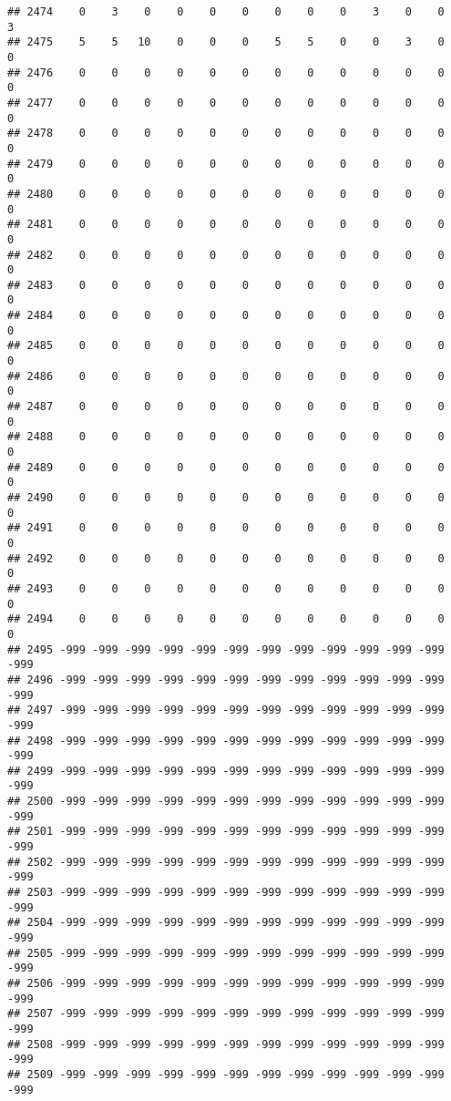 \documentclass[]{article}
\begin{document}
\begin{verbatim}
## 2474    0    3    0    0    0    0    0    0    0    3    0    0    3
## 2475    5    5   10    0    0    0    5    5    0    0    3    0    0
## 2476    0    0    0    0    0    0    0    0    0    0    0    0    0
## 2477    0    0    0    0    0    0    0    0    0    0    0    0    0
## 2478    0    0    0    0    0    0    0    0    0    0    0    0    0
## 2479    0    0    0    0    0    0    0    0    0    0    0    0    0
## 2480    0    0    0    0    0    0    0    0    0    0    0    0    0
## 2481    0    0    0    0    0    0    0    0    0    0    0    0    0
## 2482    0    0    0    0    0    0    0    0    0    0    0    0    0
## 2483    0    0    0    0    0    0    0    0    0    0    0    0    0
## 2484    0    0    0    0    0    0    0    0    0    0    0    0    0
## 2485    0    0    0    0    0    0    0    0    0    0    0    0    0
## 2486    0    0    0    0    0    0    0    0    0    0    0    0    0
## 2487    0    0    0    0    0    0    0    0    0    0    0    0    0
## 2488    0    0    0    0    0    0    0    0    0    0    0    0    0
## 2489    0    0    0    0    0    0    0    0    0    0    0    0    0
## 2490    0    0    0    0    0    0    0    0    0    0    0    0    0
## 2491    0    0    0    0    0    0    0    0    0    0    0    0    0
## 2492    0    0    0    0    0    0    0    0    0    0    0    0    0
## 2493    0    0    0    0    0    0    0    0    0    0    0    0    0
## 2494    0    0    0    0    0    0    0    0    0    0    0    0    0
## 2495 -999 -999 -999 -999 -999 -999 -999 -999 -999 -999 -999 -999 -999
## 2496 -999 -999 -999 -999 -999 -999 -999 -999 -999 -999 -999 -999 -999
## 2497 -999 -999 -999 -999 -999 -999 -999 -999 -999 -999 -999 -999 -999
## 2498 -999 -999 -999 -999 -999 -999 -999 -999 -999 -999 -999 -999 -999
## 2499 -999 -999 -999 -999 -999 -999 -999 -999 -999 -999 -999 -999 -999
## 2500 -999 -999 -999 -999 -999 -999 -999 -999 -999 -999 -999 -999 -999
## 2501 -999 -999 -999 -999 -999 -999 -999 -999 -999 -999 -999 -999 -999
## 2502 -999 -999 -999 -999 -999 -999 -999 -999 -999 -999 -999 -999 -999
## 2503 -999 -999 -999 -999 -999 -999 -999 -999 -999 -999 -999 -999 -999
## 2504 -999 -999 -999 -999 -999 -999 -999 -999 -999 -999 -999 -999 -999
## 2505 -999 -999 -999 -999 -999 -999 -999 -999 -999 -999 -999 -999 -999
## 2506 -999 -999 -999 -999 -999 -999 -999 -999 -999 -999 -999 -999 -999
## 2507 -999 -999 -999 -999 -999 -999 -999 -999 -999 -999 -999 -999 -999
## 2508 -999 -999 -999 -999 -999 -999 -999 -999 -999 -999 -999 -999 -999
## 2509 -999 -999 -999 -999 -999 -999 -999 -999 -999 -999 -999 -999 -999

\end{verbatim}
\end{document}
